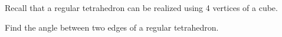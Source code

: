 Recall that a regular tetrahedron can be realized using 4 vertices of a cube. 

Find the angle between two edges of a regular tetrahedron. 